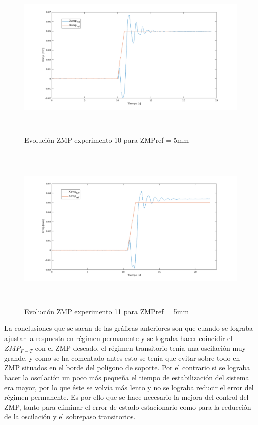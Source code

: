 \begin{figure}[H]
\centering
\includegraphics[width=13cm, height=8cm]{imagenes/apartado_5/5.1/58}
\caption{Evolución ZMP experimento 10 para ZMPref = 5mm}
\label{figura58}
\end{figure}

\begin{figure}[H]
\centering
\includegraphics[width=13cm, height=8cm]{imagenes/apartado_5/5.1/59}
\caption{Evolución ZMP experimento 11 para ZMPref = 5mm}
\label{figura59}
\end{figure}


La conclusiones que se sacan de las gráficas anteriores son que cuando se lograba ajustar la respuesta en régimen permanente y se lograba hacer coincidir el $ZMP_{F-T}$ con el ZMP deseado, el régimen transitorio tenía una oscilación muy grande, y como se ha comentado antes esto se tenía que evitar sobre todo en ZMP situados en el borde del polígono de soporte. Por el contrario si se lograba hacer la oscilación un poco más pequeña el tiempo de estabilización del sistema era mayor, por lo que éste se volvía más lento y no se lograba reducir el error del régimen permanente. Es por ello que se hace necesario la mejora del control del ZMP, tanto para eliminar el error de estado estacionario como para la reducción de la oscilación y el sobrepaso transitorios.

